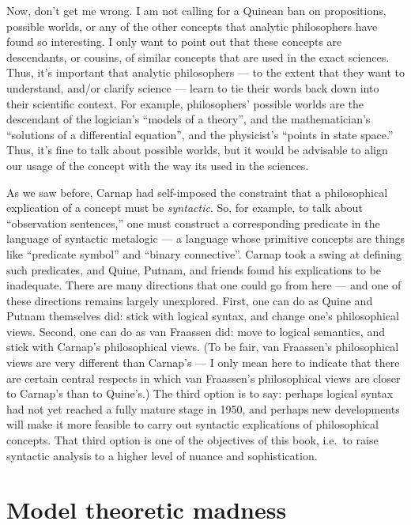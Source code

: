 Now, don't get me wrong.  I am not calling for a Quinean ban on
propositions, possible worlds, or any of the other concepts that
analytic philosophers have found so interesting.  I only want to point
out that these concepts are descendants, or cousins, of similar
concepts that are used in the exact sciences.  Thus, it's important
that analytic philosophers --- to the extent that they want to
understand, and/or clarify science --- learn to tie their words back
down into their scientific context.  For example, philosophers'
possible worlds are the descendant of the logician's ``models of a
theory'', and the mathematician's ``solutions of a differential
equation'', and the physicist's ``points in state space.''  Thus, it's
fine to talk about possible worlds, but it would be advisable to align
our usage of the concept with the way its used in the sciences.

As we saw before, Carnap had self-imposed the constraint that a
philosophical explication of a concept must be {\it syntactic}.  So,
for example, to talk about ``observation sentences,'' one must
construct a corresponding predicate in the language of syntactic
metalogic --- a language whose primitive concepts are things like
``predicate symbol'' and ``binary connective''.  Carnap took a swing
at defining such predicates, and Quine, Putnam, and friends found his
explications to be inadequate.  There are many directions that one
could go from here --- and one of these directions remains largely
unexplored.  First, one can do as Quine and Putnam themselves did:
stick with logical syntax, and change one's philosophical views.
Second, one can do as van Fraassen did: move to logical semantics, and
stick with Carnap's philosophical views.  (To be fair, van Fraassen's
philosophical views are very different than Carnap's --- I only mean
here to indicate that there are certain central respects in which van
Fraassen's philosophical views are closer to Carnap's than to
Quine's.)  The third option is to say: perhaps logical syntax had not
yet reached a fully mature stage in 1950, and perhaps new developments
will make it more feasible to carry out syntactic explications of
philosophical concepts.  That third option is one of the objectives of
this book, i.e.\ to raise syntactic analysis to a higher level of
nuance and sophistication.

\section*{Model theoretic madness}


